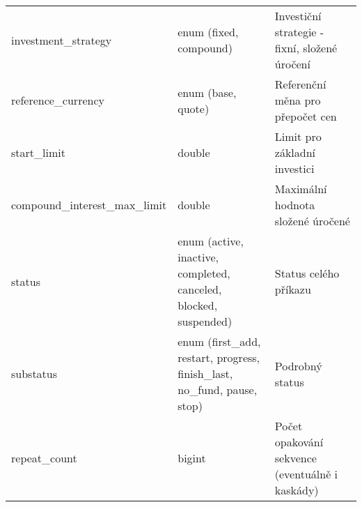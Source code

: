 \begin{center}
\begin{longtable}[h]{|l|C{4cm}|p{4cm}|}
        investment\_strategy                  & enum (fixed, compound)                                                                                                                                           & Investiční strategie - fixní, složené úročení                                                                                     \\
        reference\_currency                   & enum (base, quote)                                                                                                                                               & Referenční měna pro přepočet cen                                                                                                  \\
        start\_limit                          & double                                                                                                                                                           & Limit pro základní investici                                                                                                      \\
        compound\_interest\_max\_limit        & double                                                                                                                                                           & Maximální hodnota složené úročené                                                                                                 \\
        status                                & enum (active, inactive, completed, canceled, blocked, suspended)                                                                                                 & Status celého příkazu                                                                                                             \\
        substatus                             & enum (first\_add, restart, progress, finish\_last, no\_fund, pause, stop)                                                                                        & Podrobný status                                                                                                                   \\
        repeat\_count                         & bigint                                                                                                                                                           & Počet opakování sekvence (eventuálně i kaskády)                                                                                   \\

\end{longtable}
\end{center}
